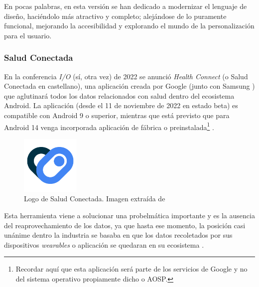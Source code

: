             En pocas palabras, en esta versión se han dedicado a modernizar el lenguaje de diseño, haciéndolo más 
            atractivo y completo; alejándose de lo puramente funcional, mejorando la accesibilidad y explorando 
            el mundo de la personalización para el usuario.

        \subsubsection{Salud Conectada}
            En la conferencia \textit{I/O} (sí, otra vez) de 2022 se anunció \textit{Health Connect} (o Salud Conectada
            en castellano), una aplicación creada por Google (junto con Samsung \cite{wilk_introducing_2022}) 
            que aglutinará todos los datos relacionados con salud dentro del ecosistema
            Android. La aplicación (desde el 11 de noviembre de 2022 en estado beta) es compatible con Android 9 o 
            superior, mientras que está previsto que para Android 14 venga
            incorporada aplicación de fábrica o preinstalada\footnote{Recordar aquí que esta aplicación será
            parte de los servicios de Google y no del sistema operativo propiamente dicho o AOSP.} 
            \cite{pandey_health_2023}. \newline

            \begin{figure}[h]
                \centering
                \includegraphics[width=0.25\textwidth]{figures/Health connect logo.png}
                \caption[Logo de Salud Conectada.]
                {Logo de Salud Conectada. Imagen extraída de \cite{noauthor_health_nodate}}
                \label{figure:health_connect:logo}
            \end{figure}

            Esta herramienta viene a solucionar una probelmática importante y es la ausencia del reaprovechamiento de 
            los datos, ya que hasta ese momento, la posición casi unánime dentro la industria se basaba en
            que los datos recoletados por sus dispositivos \textit{wearables} o aplicación se quedaran en su
            ecosistema \cite{ramirez_android_2022} \cite{rahman_android_2023}. \newline
            
